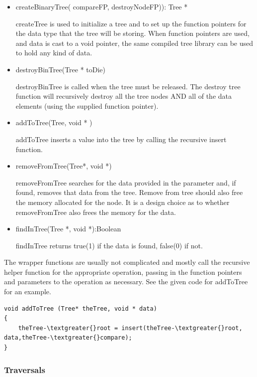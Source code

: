 \begin{itemize}
\item {createBinaryTree( compareFP, destroyNodeFP)): Tree *

createTree is used to initialize a tree and to set up the function
pointers for the data type that the tree will be storing. When function
pointers are used, and data is cast to a void pointer, the same compiled
tree library can be used to hold any kind of data.
}
\item {destroyBinTree(Tree * toDie)

destroyBinTree is called when the tree must be released. The destroy
tree function will recursively destroy all the tree nodes AND all of the
data elements (using the supplied function pointer).
}

\item {addToTree(Tree, void * )

addToTree inserts a value into the tree by calling the recursive insert function.
}

\item {removeFromTree(Tree*, void *)

removeFromTree searches for the data provided in the parameter and, if found, removes that data from the tree.  Remove from tree should also free the memory allocated for the node.  It is a design choice as to whether removeFromTree also frees the memory for the data.

}

\item {findInTree(Tree *, void *):Boolean 

findInTree returns true(1) if the data is found, false(0) if not.
}

\end{itemize}

The wrapper functions are usually not complicated and mostly call the recursive helper function for the
appropriate operation, passing in the function pointers and parameters to the operation as necessary. See the given code
for addToTree for an example.

\begin{lstlisting}
void addToTree (Tree* theTree, void * data)
{
	theTree-\textgreater{}root = insert(theTree-\textgreater{}root, data,theTree-\textgreater{}compare);
}

\end{lstlisting}


\subsubsection{Traversals}

